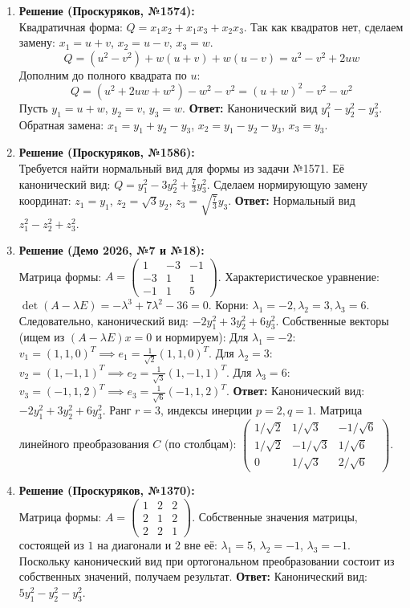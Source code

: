 \begin{enumerate}
    \item \textbf{Решение (Проскуряков, №1574):}\\
    Квадратичная форма: $Q = x_1 x_2 + x_1 x_3 + x_2 x_3$. Так как квадратов нет, сделаем замену: $x_1 = u + v$, $x_2 = u - v$, $x_3 = w$.
    $$Q = (u^2 - v^2) + w(u + v) + w(u - v) = u^2 - v^2 + 2uw$$
    Дополним до полного квадрата по $u$:
    $$Q = (u^2 + 2uw + w^2) - w^2 - v^2 = (u + w)^2 - v^2 - w^2$$
    Пусть $y_1 = u + w$, $y_2 = v$, $y_3 = w$.
    \textbf{Ответ:} Канонический вид $y_1^2 - y_2^2 - y_3^2$. 
    Обратная замена: $x_1 = y_1 + y_2 - y_3$, $x_2 = y_1 - y_2 - y_3$, $x_3 = y_3$.

    \item \textbf{Решение (Проскуряков, №1586):}\\
    Требуется найти нормальный вид для формы из задачи №1571.
    Её канонический вид: $Q = y_1^2 - 3y_2^2 + \frac{7}{3}y_3^2$.
    Сделаем нормирующую замену координат: $z_1 = y_1$, $z_2 = \sqrt{3} y_2$, $z_3 = \sqrt{\frac{7}{3}} y_3$.
    \textbf{Ответ:} Нормальный вид $z_1^2 - z_2^2 + z_3^2$.

    \item \textbf{Решение (Демо 2026, №7 и №18):}\\
    Матрица формы: $A = \begin{pmatrix} 1 & -3 & -1 \\ -3 & 1 & 1 \\ -1 & 1 & 5 \end{pmatrix}$.
    Характеристическое уравнение: $\det(A - \lambda E) = -\lambda^3 + 7\lambda^2 - 36 = 0$.
    Корни: $\lambda_1 = -2, \lambda_2 = 3, \lambda_3 = 6$. Следовательно, канонический вид: $-2y_1^2 + 3y_2^2 + 6y_3^2$.
    Собственные векторы (ищем из $(A-\lambda E)x = 0$ и нормируем):
    Для $\lambda_1 = -2$: $v_1 = (1, 1, 0)^T \implies e_1 = \frac{1}{\sqrt{2}}(1, 1, 0)^T$.
    Для $\lambda_2 = 3$: $v_2 = (1, -1, 1)^T \implies e_2 = \frac{1}{\sqrt{3}}(1, -1, 1)^T$.
    Для $\lambda_3 = 6$: $v_3 = (-1, 1, 2)^T \implies e_3 = \frac{1}{\sqrt{6}}(-1, 1, 2)^T$.
    \textbf{Ответ:} Канонический вид: $-2y_1^2 + 3y_2^2 + 6y_3^2$. Ранг $r=3$, индексы инерции $p=2, q=1$.
    Матрица линейного преобразования $C$ (по столбцам): $\begin{pmatrix} 1/\sqrt{2} & 1/\sqrt{3} & -1/\sqrt{6} \\ 1/\sqrt{2} & -1/\sqrt{3} & 1/\sqrt{6} \\ 0 & 1/\sqrt{3} & 2/\sqrt{6} \end{pmatrix}$.

    \item \textbf{Решение (Проскуряков, №1370):}\\
    Матрица формы: $A = \begin{pmatrix} 1 & 2 & 2 \\ 2 & 1 & 2 \\ 2 & 2 & 1 \end{pmatrix}$.
    Собственные значения матрицы, состоящей из $1$ на диагонали и $2$ вне её: $\lambda_1 = 5$, $\lambda_2 = -1$, $\lambda_3 = -1$.
    Поскольку канонический вид при ортогональном преобразовании состоит из собственных значений, получаем результат.
    \textbf{Ответ:} Канонический вид: $5y_1^2 - y_2^2 - y_3^2$.


\end{enumerate}
